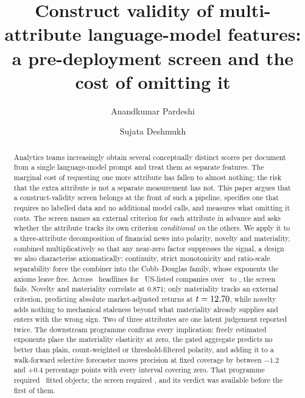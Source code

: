\documentclass[preprint,12pt,authoryear]{elsarticle}
\theoremstyle{plain}
\theoremstyle{remark}
\newif\ifblind
\begin{document}
\begin{frontmatter}

\title{Construct validity of multi-attribute language-model features:
a pre-deployment screen and the cost of omitting it}

\ifblind
\author{}
\address{}
\else
\author[fcrit]{Anandkumar Pardeshi}
\author[frcoe]{Sujata Deshmukh}
\address[fcrit]{Department of Computer Science and Engineering,
Fr.~C.~Rodrigues Institute of Technology, University of Mumbai,
Vashi, Navi Mumbai, India}
\address[frcoe]{Department of Computer Engineering,
Fr.~C.~Rodrigues College of Engineering, University of Mumbai,
Bandra, Mumbai, India}
\fi

\begin{abstract}
Analytics teams increasingly obtain several conceptually distinct scores per
document from a single language-model prompt and treat them as separate
features. The marginal cost of requesting one more attribute has fallen to
almost nothing; the risk that the extra attribute is not a separate measurement
has not. This paper argues that a construct-validity screen belongs at the front
of such a pipeline, specifies one that requires no labelled data and no
additional model calls, and measures what omitting it costs. The screen names an
external criterion for each attribute in advance and asks whether the attribute
tracks its own criterion \emph{conditional on} the others. We apply it to a
three-attribute decomposition of financial news into polarity, novelty and
materiality, combined multiplicatively so that any near-zero factor suppresses
the signal, a design we also characterise axiomatically: continuity, strict
monotonicity and ratio-scale separability force the combiner into the
Cobb--Douglas family, whose exponents the axioms leave free. Across
\ScoredHeadlines\ headlines for \NCompanies\ US-listed companies over
\PanelStart\ to \PanelEnd, the screen fails. Novelty and materiality correlate
at $0.871$; only materiality tracks an external criterion, predicting absolute
market-adjusted returns at $t=12.70$, while novelty adds nothing to
mechanical staleness beyond what materiality already supplies and enters with
the wrong sign. Two of three attributes are one latent judgement reported twice.
The downstream programme confirms every implication: freely estimated exponents
place the materiality elasticity at zero, the gated aggregate predicts no better
than plain, count-weighted or threshold-filtered polarity, and adding it to a
walk-forward selective forecaster moves precision at fixed coverage by between
$-1.2$ and $+0.4$ percentage points with every interval covering zero. That
programme required \DownstreamTotal\ fitted objects; the screen required
\ScreenTotal, and its verdict was available before the first of them.
\end{abstract}


\end{frontmatter}
\end{document}
